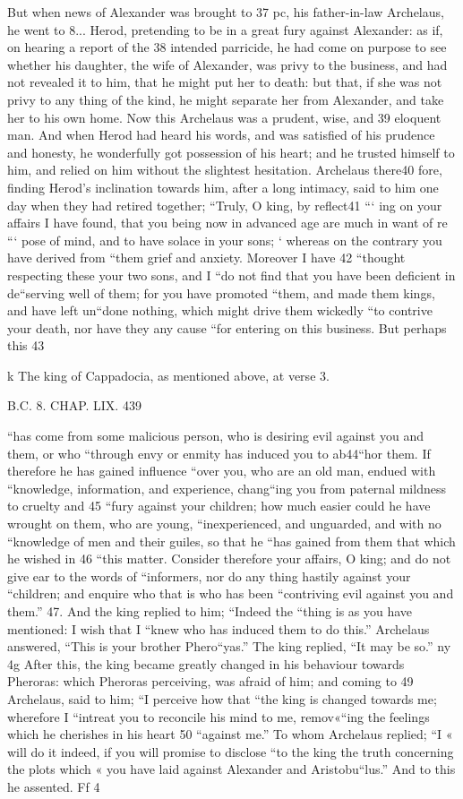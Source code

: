 But when news of Alexander was brought to 37 pc, his father-in-law Archelaus, he went to 8... Herod, pretending to be in a great fury against Alexander: as if, on hearing a report of the 38 intended parricide, he had come on purpose to see whether his daughter, the wife of Alexander, was privy to the business, and had not revealed it to him, that he might put her to death: but that, if she was not privy to any thing of the kind, he might separate her from Alexander, and take her to his own home. 
Now this Archelaus was a prudent, wise, and 39 eloquent man. And when Herod had heard his words, and was satisfied of his prudence and honesty, he wonderfully got possession of his heart; and he trusted himself to him, and relied on him without the slightest hesitation. Archelaus there40 fore, finding Herod’s inclination towards him, after a long intimacy, said to him one day when they had retired together; “Truly, O king, by reflect41 “‘ ing on your affairs I have found, that you being now in advanced age are much in want of re
“‘ pose of mind, and to have solace in your sons; ‘ whereas on the contrary you have derived from “them grief and anxiety. Moreover I have 42 “thought respecting these your two sons, and I “do not find that you have been deficient in de“serving well of them; for you have promoted “them, and made them kings, and have left un“done nothing, which might drive them wickedly “to contrive your death, nor have they any cause “for entering on this business. But perhaps this 43 

k The king of Cappadocia, as mentioned above, at verse 3. 

B.C. 8. CHAP. LIX. 439 

“has come from some malicious person, who is desiring evil against you and them, or who “through envy or enmity has induced you to ab44“hor them. If therefore he has gained influence “over you, who are an old man, endued with “knowledge, information, and experience, chang“ing you from paternal mildness to cruelty and 45 “fury against your children; how much easier could he have wrought on them, who are young, “inexperienced, and unguarded, and with no “knowledge of men and their guiles, so that he “has gained from them that which he wished in 46 “this matter. Consider therefore your affairs, O king; and do not give ear to the words of “informers, nor do any thing hastily against your “children; and enquire who that is who has been “contriving evil against you and them.” 47. And the king replied to him; “Indeed the “thing is as you have mentioned: I wish that I “knew who has induced them to do this.” Archelaus answered, “This is your brother Phero“yas.” The king replied, “It may be so.” ny 4g After this, the king became greatly changed in his behaviour towards Pheroras: which Pheroras perceiving, was afraid of him; and coming to 49 Archelaus, said to him; “I perceive how that “the king is changed towards me; wherefore I “intreat you to reconcile his mind to me, remov«“ing the feelings which he cherishes in his heart 50 “against me.” To whom Archelaus replied; “I « will do it indeed, if you will promise to disclose “to the king the truth concerning the plots which « you have laid against Alexander and Aristobu“lus.” And to this he assented. Ff 4 

